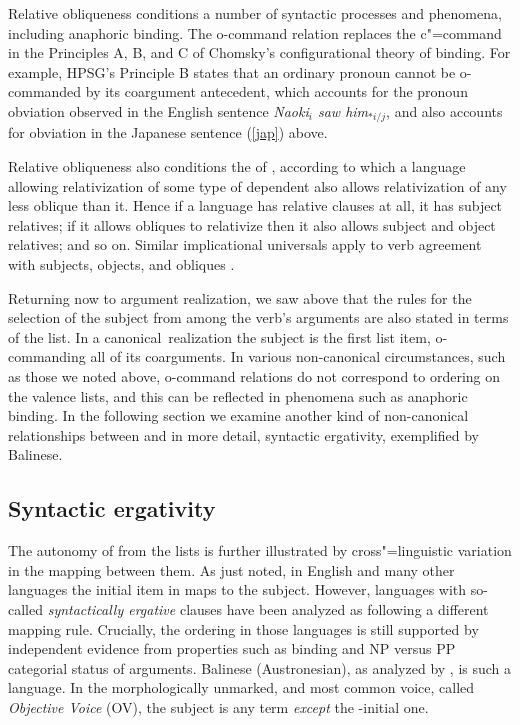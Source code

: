 \documentclass[output=paper
                ,modfonts
                ,nonflat
	        ,collection
	        ,collectionchapter
	        ,collectiontoclongg
 	        ,biblatex
                ,babelshorthands
                ,newtxmath
                ,draftmode
                ,colorlinks, citecolor=brown
]{./langsci/langscibook}
\begin{document}
Relative obliqueness conditions a number of syntactic processes and phenomena, including anaphoric binding.  The o-command relation replaces the c"=command in the Principles A, B, and C of Chomsky's \citeyearpar{Chomsky:1981} configurational theory of binding.  For example, HPSG's Principle B states that an ordinary pronoun cannot be o-commanded by its coargument antecedent, which accounts for the pronoun obviation observed in the English sentence \textit{Naoki$_i$ saw him$_{*i/j}$}, and also accounts for obviation in the Japanese sentence (\ref{jap}) above.  

Relative obliqueness also conditions the  of \citet{KeenanandComrie1977}, according to which a language allowing relativization of some type of dependent also allows relativization of any less oblique than it.  Hence if a language has relative clauses at all, it has subject relatives; if it allows obliques to relativize then it also allows subject and object relatives; and so on.  
Similar implicational universals apply to verb agreement with subjects, objects, and obliques  \citet{greenberg:1966}.  

Returning now to argument realization, we saw above that the rules for the selection of the subject from among the verb's arguments are also stated in terms of the \argst list.  In a canonical\ realization the subject is the first list item, o-commanding all of its coarguments.
In various non-canonical circumstances, such as those we noted above, o-command relations do not correspond to ordering on the valence lists, and this can be reflected in phenomena such as anaphoric binding.
In the following section we examine another kind of non-canonical relationships between \argst and \val in more detail, syntactic ergativity, exemplified by Balinese.

\subsection{Syntactic ergativity}
\label{ergativity}\label{arg-st-sec-ergativity}
The autonomy of \argst from the \val lists is further illustrated by cross"=linguistic variation in the mapping between them.  As just noted, in English and many other languages the initial item in \argst maps to the subject.  However,  languages with so-called \emph{syntactically ergative} clauses have been analyzed as following a different mapping rule.  Crucially, the \argst ordering in those languages is still supported by independent evidence from properties such as binding and NP versus PP categorial status of arguments.
Balinese (Austronesian), as analyzed by \citet{Wechsler+Arka:1998}, is such a language.  In the morphologically unmarked, and most common voice, called \emph{Objective Voice} (OV), the subject is any term \textit{except} the \argst-initial one.   
\end{document}
